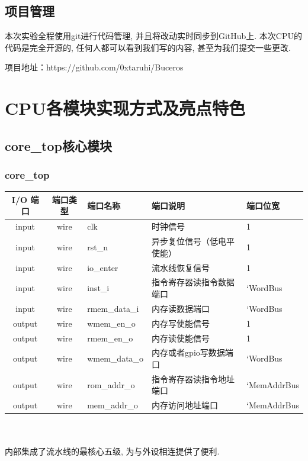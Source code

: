 \documentclass[lang=cn,11pt,a4paper,chinesefont=founder]{elegantpaper}
\begin{document}
\subsection{项目管理}

本次实验全程使用git进行代码管理, 并且将改动实时同步到GitHub上. 本次CPU的代码是完全开源的, 任何人都可以看到我们写的内容, 
甚至为我们提交一些更改. 

项目地址：https://github.com/0xtaruhi/Buceros

\section{CPU各模块实现方式及亮点特色}
\subsection{core\_top核心模块}
\subsubsection{core\_top}
\begin{tabular}{cclll}
    \toprule
    I/O 端口 & 端口类型 & 端口名称      & 端口说明                   & 端口位宽    \\
    \midrule
    input    & wire     & clk           & 时钟信号                   & 1           \\
    input    & wire     & rst\_n        & 异步复位信号（低电平使能） & 1           \\
    input    & wire     & io\_enter     & 流水线恢复信号             & 1           \\

    input    & wire     & inst\_i       & 指令寄存器读指令数据端口   & `WordBus    \\
    input    & wire     & rmem\_data\_i & 内存读数据端口             & `WordBus    \\

    output   & wire     & wmem\_en\_o   & 内存写使能信号             & 1           \\
    output   & wire     & rmem\_en\_o   & 内存读使能信号             & 1           \\
    output   & wire     & wmem\_data\_o & 内存或者gpio写数据端口     & `WordBus    \\
    output   & wire     & rom\_addr\_o  & 指令寄存器读指令地址端口   & `MemAddrBus \\
    output   & wire     & mem\_addr\_o  & 内存访问地址端口           & `MemAddrBus \\
    \bottomrule
\end{tabular}\\
\\
内部集成了流水线的最核心五级, 为与外设相连提供了便利. 
\end{document}

